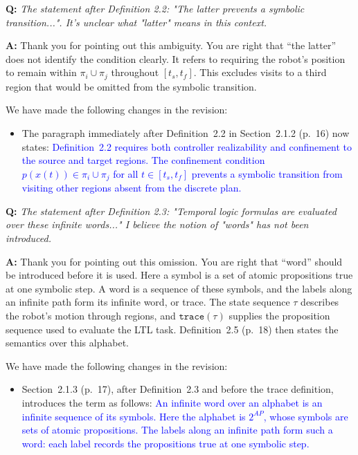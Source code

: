 \documentclass[11pt]{article}
\newcommand{\change}[1]{\textcolor{blue}{#1}}
\begin{document}
\begin{shaded*}
\noindent\textbf{Q:} \emph{The statement after Definition 2.2: "The latter
prevents a symbolic transition...". It's unclear what "latter" means in this
context.}
\end{shaded*}
\noindent\textbf{A:} Thank you for pointing out this ambiguity. You are right that
``the latter'' does not identify the condition clearly. It refers to requiring the
robot's position to remain within $\pi_i\cup\pi_j$ throughout $[t_s,t_f]$.
This excludes visits to a third region that would be omitted from the symbolic
transition.

We have made the following changes in the revision:
\begin{itemize}
\item The paragraph immediately after Definition~2.2 in Section~2.1.2 (p.~16)
now states:
\change{Definition~2.2 requires both controller realizability and
confinement to the source and target regions. The confinement condition
$p(x(t))\in\pi_i\cup\pi_j$ for all $t\in[t_s,t_f]$ prevents a symbolic
transition from visiting other regions absent from the discrete plan.}
\end{itemize}

\begin{shaded*}
\noindent\textbf{Q:} \emph{The statement after Definition 2.3: "Temporal
logic formulas are evaluated over these infinite words..." I believe the notion of "words"
has not been introduced.}
\end{shaded*}
\noindent\textbf{A:} Thank you for pointing out this omission. You are right that
``word'' should be introduced before it is used. Here a symbol is a set of atomic
propositions true at one symbolic step. A word is a sequence of these symbols,
and the labels along an infinite path form its infinite word, or trace.
The state sequence $\tau$ describes the robot's motion through regions, and
$\texttt{trace}(\tau)$ supplies the proposition sequence used to evaluate the LTL
task. Definition~2.5 (p.~18) then states the semantics over this alphabet.

We have made the following changes in the revision:
\begin{itemize}
\item Section~2.1.3 (p.~17), after Definition~2.3 and before the trace definition,
introduces the term as follows:
\change{An infinite word over an alphabet is an infinite sequence of its symbols.
Here the alphabet is $2^{AP}$, whose symbols are sets of atomic propositions.
The labels along an infinite path form such a word: each label records
the propositions true at one symbolic step.}
\end{itemize}
\end{document}
